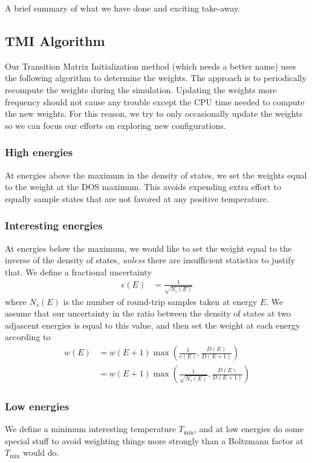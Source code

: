 \documentclass[letterpaper,twocolumn,amsmath,amssymb,pre,aps,10pt]{revtex4-1}
\begin{document}
A brief summary of what we have done and exciting take-away.

\subsection{TMI Algorithm}

Our Transition Matrix Initialization method (which needs a better
name) uses the following algorithm to determine the weights.  The
approach is to periodically recompute the weights during the
simulation.  Updating the weights more frequency should not cause any
trouble except the CPU time needed to compute the new weights.  For
this reason, we try to only occasionally update the weights so we can
focus our efforts on exploring new configurations.

\subsubsection{High energies}
At energies above the maximum in the density of states, we set
the weights equal to the weight at the DOS maximum.  This avoids
expending extra effort to equally sample states that are not favored
at any positive temperature.

\subsubsection{Interesting energies}
At energies below the maximum, we would like to set the weight equal
to the inverse of the density of states, \emph{unless} there are
insufficient statistics to justify that.  We define a fractional
uncertainty
\begin{align}
  \epsilon(E) &= \frac{1}{\sqrt{N_s(E)}}
\end{align}
where $N_s(E)$ is the number of round-trip samples taken at energy
$E$.  We assume that our uncertainty in the ratio between the density
of states at two adjascent energies is equal to this value, and then
set the weight at each energy according to
\begin{align}
  w(E) &= w(E+1)\max\left(\frac1{\epsilon(E)},
  \frac{D(E)}{D(E+1)}\right)
  \\
   &= w(E+1)\max\left(\frac1{\sqrt{N_s(E)}},
  \frac{D(E)}{D(E+1)}\right)
\end{align}

\subsubsection{Low energies}
We define a minimum interesting temperature $T_{\min}$, and at low
energies do some special stuff to avoid weighting things more
strongly than a Boltzmann factor at $T_{\min}$ would do.
\end{document}
